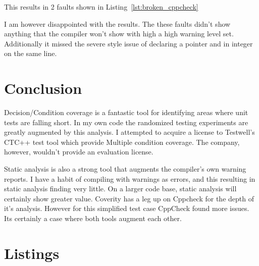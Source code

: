 \documentclass[12pt,journal]{article}
\begin{document}


This results in 2 faults shown in Listing~\ref{lst:broken_cppcheck}

I am however disappointed with the results. The these faults didn't show
anything that the compiler won't show with high a high warning level set.
Additionally it missed the severe style issue of declaring a pointer and in
integer on the same line.  

\section{Conclusion}
Decision/Condition coverage is a fantastic tool for identifying areas where unit
tests are falling short. In my own code the randomized testing experiments are
greatly augmented by this analysis. I attempted to acquire a license to
Testwell's CTC++ test tool which provide Multiple condition coverage. The
company, however,  wouldn't provide an evaluation
license. 

Static analysis is also a strong tool that augments the compiler's own warning
reports. I have a habit of compiling with warnings as errors, and this resulting
in static analysis finding very little. On a larger code base, static analysis
will certainly show greater value. Coverity has a leg up on Cppcheck for the
depth of it's analysis. However for this simplified test case CppCheck found
more issues. Its certainly a case where both tools augment each other.

\clearpage
\printbibliography

\clearpage
\section{Listings}


\end{document}
